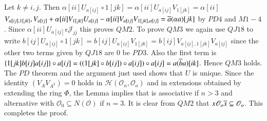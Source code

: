 Let $k\neq i,j$. Then $\alpha[ii]U_{a[ij]}\circ
1[jk]=\alpha[ii] U_{a[ij]}V_{1[jk]}=\alpha[ii]$ $V_{a[ij],1[jk]},V_{a[ij]}+\alpha[ii]V_{1[jk]}U_{a[ij]}-\alpha[ii]V_{a[ij]}V_{1[jk],a[ij]}=\overline{a}(\alpha
a)[jk]$ by $PD 4$ and $M1-4$. Since $\alpha[ii]U_{a[ij]}\epsilon
\mathscr{J}_{jj}$ this proves $QM 2$. To prove $QM 3$ we again use $QJ
18$ to write $b[ij]U_{a[ij]}\circ
1[jk]=b[ij]U_{a[ij]}V_{1[jk]}=b[ij]V_{a[ij],1[jk]}V_{a[ij]}$ since the
other two terms given by  $QJ 18$ are $0$ be $PD 3$. Also the first
term is $\{1[jk]b[ij]a[ij]\}\circ a[ij]=((1[jk]\circ b[ij])\circ
a[ij])\circ a[ij]=a(\overline{b} a)[ik]$. Hence $QM 3$ holds. The $PD$
theorem and the argument just used shows that $U$ is unique. Since the
identity $(V_A V_{A^{2}})=0$ holds in
$\mathscr{H}(\mathscr{O}_n,\mathscr{O}_o)$ and in extensions obtained
by extending  the ring $\Phi$, the  Lemma implies that is associative
if $n>3$ and alternative with $\mathscr{O}_0\subseteq N(\mathscr{O})$
if $n=3$. It is clear from $QM 2$ that $x\mathscr{O}_o\overline{x}\subseteq
\mathscr{O}_o$. This completes the proof.

